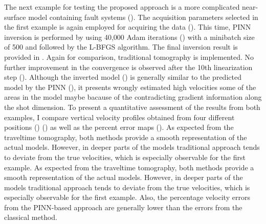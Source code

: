 The next example for testing the proposed approach is a more complicated near-surface model containing fault systems (). The acquisition parameters selected in the first example is again employed for acquiring the data (). This time, PINN inversion is performed by using 40,000 Adam iterations  () with a minibatch size of 500 and followed by the L-BFGS algorithm. The final inversion result is provided in . Again for comparison, traditional tomography is implemented. No further improvement in the convergence is observed after the 10th linearization step (). Although the inverted model () is generally similar to the predicted model by the PINN  (), it presents wrongly estimated high velocities some of the areas in the model maybe bacause of the contradicting gradient information along the shot dimension. To present a quantitative assessment of the results from both examples, I compare vertical velocity profiles obtained from four different positions () () as well as the percent error maps (). As expected from the traveltime tomography, both methods provide a smooth representation of the actual models. However, in deeper parts of the models traditional approach tends to deviate from the true velocities, which is especially observable for the first example. As expected from the traveltime tomography, both methods provide a smooth representation of the actual models. However, in deeper parts of the models traditional approach tends to deviate from the true velocities, which is especially observable for the first example. Also, the percentage velocity errors from the PINN-based approach are generally lower than the errors from the classical method.
